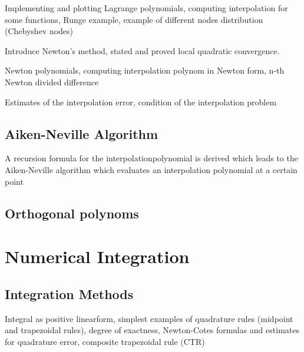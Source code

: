 \documentclass{article}
\theoremstyle{remark}
\begin{document}
\begin{tcolorbox}
  Implementing and plotting Lagrange polynomials, computing interpolation for some functions, Runge example, example of different nodes distribution (Chebyshev nodes)	
\end{tcolorbox}

\begin{tcolorbox}
   Introduce Newton's method, stated and proved local quadratic convergence. 	
\end{tcolorbox}

\begin{tcolorbox}
  Newton polynomials, computing interpolation polynom in Newton form, n-th Newton divided difference	
\end{tcolorbox}

\begin{tcolorbox}
  Estimates of the interpolation error, condition of the interpolation problem	
\end{tcolorbox}

\subsection{Aiken-Neville Algorithm}%
\label{sub:aiken_neville_algorithm}


\begin{tcolorbox}
  A recursion formula for the interpolationpolynomial is derived  which leads to the Aiken-Neville algorithm which evaluates an interpolation polynomial at a certain point	
\end{tcolorbox}


\subsection{Orthogonal polynoms}%
\label{sub:orthogonal_polynoms}

\newpage
\section{Numerical Integration}%
\label{sec:numerical_integration}

\subsection{Integration Methods}%
\label{sub:trapezoid_rule}
\begin{tcolorbox}
  Integral as positive linearform, simplest examples of  quadrature rules (midpoint and trapezoidal rules), degree of exactness, Newton-Cotes formulas and estimates for quadrature error, composite trapezoidal rule (CTR)
\end{tcolorbox}
\end{document}
